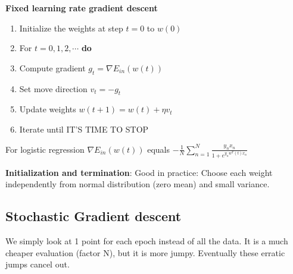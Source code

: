 \documentclass{article}
\begin{document}
    \textbf{Fixed learning rate gradient descent} 
    \begin{enumerate}
      \item Initialize the weights at step $t = 0$ to $w(0)$
      \item For $t = 0, 1, 2, \cdots $ \textbf{do}
      \item Compute gradient $g_t = \nabla E_{in}(w(t))$
      \item Set move direction $v_t = -g_t$
      \item Update weights $w(t+1) = w(t) + \eta v_t$
      \item Iterate until IT'S TIME TO STOP
    \end{enumerate}
    For logistic regression $\nabla E_{in}(w(t))$ equals $-\frac{1}{N}\sum_{n=1}^{N}\frac{y_nx_n}{1+e^{y_nw^T(t)x_n}}$

    \textbf{Initialization and termination}: Good in practice: Choose each weight independently from normal distribution (zero mean) and small variance.

    \subsection{Stochastic Gradient descent}
    We simply look at 1 point for each epoch instead of all the data. It is a much cheaper evaluation (factor N), but it is more jumpy. Eventually these erratic jumps cancel out.
\end{document}
